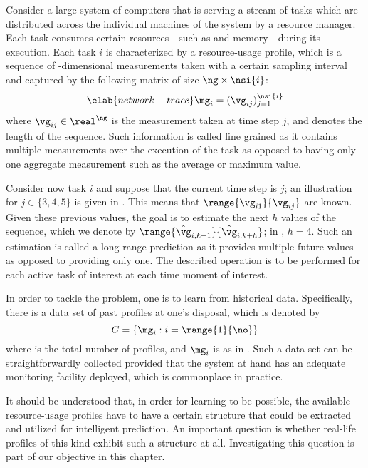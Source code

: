 Consider a large system of computers that is serving a stream of tasks which are
distributed across the individual machines of the system by a resource manager.
Each task consumes certain resources---such as  and memory---during its
execution. Each task $i$ is characterized by a resource-usage profile, which is
a sequence of \ng-dimensional measurements taken with a certain sampling
interval and captured by the following matrix of size $\ng \times \nsi{i}$:
\begin{equation} \elab{network-trace}
  \mg_i = (\vg_{ij})_{j = 1}^\nsi{i}
\end{equation}
where $\vg_{ij} \in \real^\ng$ is the measurement taken at time step $j$, and
 denotes the length of the sequence. Such information is called
fine grained as it contains multiple measurements over the execution of the task
as opposed to having only one aggregate measurement such as the average or
maximum value.

Consider now task $i$ and suppose that the current time step is $j$; an
illustration for $j \in \{3, 4, 5\}$ is given in . This
means that $\range{\vg_{i1}}{\vg_{ij}}$ are known. Given these previous values,
the goal is to estimate the next $h$ values of the sequence, which we denote by
$\range{\hat{\vg}_{i,k + 1}}{\hat{\vg}_{i,k + h}}$; in ,
$h = 4$. Such an estimation is called a long-range prediction as it provides
multiple future values as opposed to providing only one. The described operation
is to be performed for each active task of interest at each time moment of
interest.

In order to tackle the problem, one is to learn from historical data.
Specifically, there is a data set of past profiles at one's disposal, which is
denoted by
\[
  G = \left\{ \mg_i: i = \range{1}{\no} \right\}
\]
where \no is the total number of profiles, and $\mg_i$ is as in
. Such a data set can be straightforwardly collected
provided that the system at hand has an adequate monitoring facility deployed,
which is commonplace in practice.

It should be understood that, in order for learning to be possible, the
available resource-usage profiles have to have a certain structure that could be
extracted and utilized for intelligent prediction. An important question is
whether real-life profiles of this kind exhibit such a structure at all.
Investigating this question is part of our objective in this chapter.
